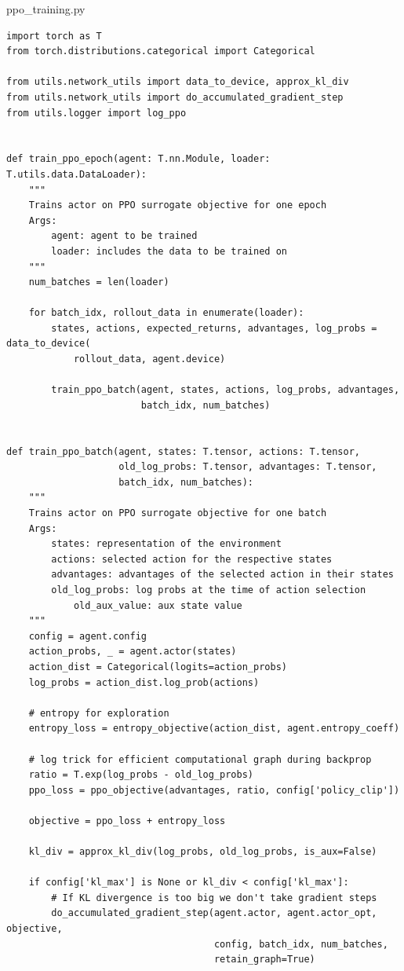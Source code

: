 \documentclass{article}
\begin{document}
ppo\_training.py
\begin{lstlisting}
import torch as T
from torch.distributions.categorical import Categorical

from utils.network_utils import data_to_device, approx_kl_div
from utils.network_utils import do_accumulated_gradient_step
from utils.logger import log_ppo


def train_ppo_epoch(agent: T.nn.Module, loader: T.utils.data.DataLoader):
    """
    Trains actor on PPO surrogate objective for one epoch
    Args:
        agent: agent to be trained
        loader: includes the data to be trained on
    """
    num_batches = len(loader)

    for batch_idx, rollout_data in enumerate(loader):
        states, actions, expected_returns, advantages, log_probs = data_to_device(
            rollout_data, agent.device)

        train_ppo_batch(agent, states, actions, log_probs, advantages,
                        batch_idx, num_batches)


def train_ppo_batch(agent, states: T.tensor, actions: T.tensor,
                    old_log_probs: T.tensor, advantages: T.tensor,
                    batch_idx, num_batches):
    """
    Trains actor on PPO surrogate objective for one batch
    Args:
        states: representation of the environment
        actions: selected action for the respective states
        advantages: advantages of the selected action in their states
        old_log_probs: log probs at the time of action selection
            old_aux_value: aux state value
    """
    config = agent.config
    action_probs, _ = agent.actor(states)
    action_dist = Categorical(logits=action_probs)
    log_probs = action_dist.log_prob(actions)

    # entropy for exploration
    entropy_loss = entropy_objective(action_dist, agent.entropy_coeff)

    # log trick for efficient computational graph during backprop
    ratio = T.exp(log_probs - old_log_probs)
    ppo_loss = ppo_objective(advantages, ratio, config['policy_clip'])

    objective = ppo_loss + entropy_loss

    kl_div = approx_kl_div(log_probs, old_log_probs, is_aux=False)

    if config['kl_max'] is None or kl_div < config['kl_max']:
        # If KL divergence is too big we don't take gradient steps
        do_accumulated_gradient_step(agent.actor, agent.actor_opt, objective,
                                     config, batch_idx, num_batches,
                                     retain_graph=True)


\end{lstlisting}
\end{document}
